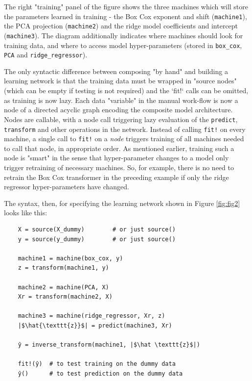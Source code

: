 \documentclass{article}
\begin{document}
The right "training" panel of the figure shows the three machines
which will store the parameters learned in training - the Box Cox
exponent and shift (\texttt{machine1}), the PCA projection
(\texttt{machine2}) and the ridge model coefficients and intercept
(\texttt{machine3}). The diagram additionally indicates where machines
should look for training data, and where to access model
hyper-parameters (stored in \texttt{box\_cox}, \texttt{PCA} and
\texttt{ridge\_regressor}).

The only syntactic difference between composing "by hand" and building
a learning network is that the training data must be wrapped in
"source nodes" (which can be empty if testing is not required) and the
`fit!` calls can be omitted, as training is now lazy. Each data
"variable" in the manual work-flow is now a node of a directed acyclic
graph encoding the composite model architecture. Nodes are callable,
with a node call triggering lazy evaluation of the \texttt{predict},
\texttt{transform} and other operations in the network. Instead of
calling \texttt{fit!} on every machine, a single call to \texttt{fit!}
on a \textit{node} triggers training of all machines needed to call
that node, in appropriate order. As mentioned earlier, training such a
node is "smart" in the sense that hyper-parameter changes to a model
only trigger retraining of necessary machines. So, for example, there
is no need to retrain the Box Cox transformer in the preceding example
if only the ridge regressor hyper-parameters have changed.

The syntax, then, for specifying the learning network shown in Figure
\ref{fig:fig2} looks like this:

\begin{verbatim}
    X = source(X_dummy)        # or just source()
    y = source(y_dummy)        # or just source()

    machine1 = machine(box_cox, y)
    z = transform(machine1, y)

    machine2 = machine(PCA, X)
    Xr = transform(machine2, X)

    machine3 = machine(ridge_regressor, Xr, z)
    |$\hat{\texttt{z}}$| = predict(machine3, Xr)

    ŷ = inverse_transform(machine1, |$\hat \texttt{z}$|)

    fit!(ŷ)  # to test training on the dummy data
    ŷ()      # to test prediction on the dummy data
\end{verbatim}
\end{document}

